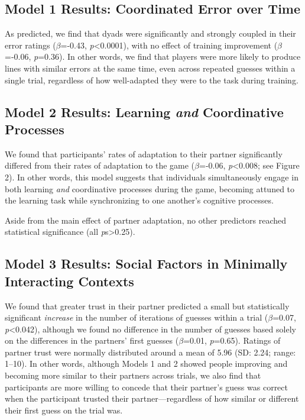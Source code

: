 \documentclass[10pt, letterpaper]{article}
\begin{document}
\subsection{Model 1 Results: Coordinated Error over
Time}\label{model-1-results-coordinated-error-over-time}

As predicted, we find that dyads were significantly and strongly coupled
in their error ratings (\emph{\(\beta\)}=-0.43,
\emph{p}\textless{}0.0001), with no effect of training improvement
(\emph{\(\beta\)}=-0.06, \emph{p}=0.36). In other words, we find that
players were more likely to produce lines with similar errors at the
same time, even across repeated guesses within a single trial,
regardless of how well-adapted they were to the task during training.

\subsection{\texorpdfstring{Model 2 Results: Learning \emph{and}
Coordinative
Processes}{Model 2 Results: Learning and Coordinative Processes}}\label{model-2-results-learning-and-coordinative-processes}

We found that participants' rates of adaptation to their partner
significantly differed from their rates of adaptation to the game
(\emph{\(\beta\)}=-0.06, \emph{p}\textless{}0.008; see Figure 2). In
other words, this model suggests that individuals simultaneously engage
in both learning \emph{and} coordinative processes during the game,
becoming attuned to the learning task while synchronizing to one
another's cognitive processes.

Aside from the main effect of partner adaptation, no other predictors
reached statistical significance (all \emph{p}s\textgreater{}0.25).

\subsection{Model 3 Results: Social Factors in Minimally Interacting
Contexts}\label{model-3-results-social-factors-in-minimally-interacting-contexts}

We found that greater trust in their partner predicted a small but
statistically significant \emph{increase} in the number of iterations of
guesses within a trial (\emph{\(\beta\)}=0.07,
\emph{p}\textless{}0.042), although we found no difference in the number
of guesses based solely on the differences in the partners' first
guesses (\emph{\(\beta\)}=0.01, \emph{p}=0.65). Ratings of partner trust
were normally distributed around a mean of 5.96 (SD: 2.24; range:
1--10). In other words, although Models 1 and 2 showed people improving
and becoming more similar to their partners across trials, we also find
that participants are more willing to concede that their partner's guess
was correct when the participant trusted their partner---regardless of
how similar or different their first guess on the trial was.
\end{document}
